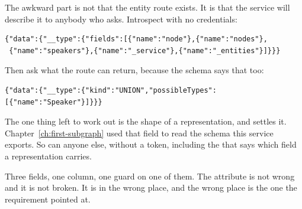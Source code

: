 %
The awkward part is not that the entity route exists. It is that the service
will describe it to anybody who asks. Introspect  with no
credentials:

\begin{verbatim}
{"data":{"__type":{"fields":[{"name":"node"},{"name":"nodes"},
 {"name":"speakers"},{"name":"_service"},{"name":"_entities"}]}}}
\end{verbatim}

%
Then ask what the route can return, because the schema says that too:

\begin{verbatim}
{"data":{"__type":{"kind":"UNION","possibleTypes":[{"name":"Speaker"}]}}}
\end{verbatim}

%
The one thing left to work out is the shape of a representation, and
 settles it. Chapter~\ref{ch:first-subgraph} used that field
to read the schema this service exports. So can anyone else, without a token,
including the  that says which field a representation carries.

%
Three fields, one column, one guard on one of them. The attribute is not
wrong and it is not broken. It is in the wrong place, and the wrong place is
the one the requirement pointed at.
%
